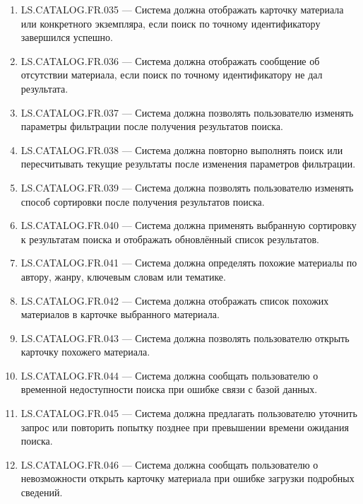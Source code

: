 \documentclass[12pt,a4paper]{article}
\begin{document}
\begin{enumerate}
		\item LS.CATALOG.FR.035 --- Система должна отображать карточку материала
		или конкретного экземпляра, если поиск по точному идентификатору завершился
		успешно.
		
		\item LS.CATALOG.FR.036 --- Система должна отображать сообщение об отсутствии
		материала, если поиск по точному идентификатору не дал результата.
		
		\item LS.CATALOG.FR.037 --- Система должна позволять пользователю изменять
		параметры фильтрации после получения результатов поиска.
		
		\item LS.CATALOG.FR.038 --- Система должна повторно выполнять поиск или
		пересчитывать текущие результаты после изменения параметров фильтрации.
		
		\item LS.CATALOG.FR.039 --- Система должна позволять пользователю изменять
		способ сортировки после получения результатов поиска.
		
		\item LS.CATALOG.FR.040 --- Система должна применять выбранную сортировку
		к результатам поиска и отображать обновлённый список результатов.
		
		\item LS.CATALOG.FR.041 --- Система должна определять похожие материалы
		по автору, жанру, ключевым словам или тематике.
		
		\item LS.CATALOG.FR.042 --- Система должна отображать список похожих
		материалов в карточке выбранного материала.
		
		\item LS.CATALOG.FR.043 --- Система должна позволять пользователю открыть
		карточку похожего материала.
		
		\item LS.CATALOG.FR.044 --- Система должна сообщать пользователю о временной
		недоступности поиска при ошибке связи с базой данных.
		
		\item LS.CATALOG.FR.045 --- Система должна предлагать пользователю уточнить
		запрос или повторить попытку позднее при превышении времени ожидания поиска.
		
		\item LS.CATALOG.FR.046 --- Система должна сообщать пользователю о невозможности
		открыть карточку материала при ошибке загрузки подробных сведений.
		

\end{enumerate}
\end{document}
